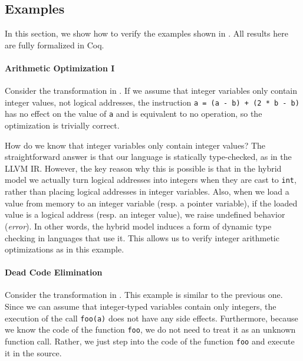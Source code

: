\subsection{Examples}
\label{sec:intptrcast:compiler-verification:examples}

In this section, we show how to verify the examples shown in .  All
results here are fully formalized in Coq.

\paragraph{Arithmetic Optimization I}

Consider the transformation in . If we assume that
integer variables only contain integer values, not logical addresses, the instruction \texttt{a = (a
  - b) + (2 * b - b)} has no effect on the value of \texttt{a} and is equivalent to no operation, so
the optimization is trivially correct.

How do we know that integer variables only contain
integer values? The straightforward answer is that our language is statically type-checked, as in the LLVM IR. However, the key reason why this is possible
is that in the hybrid model we actually turn logical addresses into integers
when they are cast to \texttt{int}, rather than placing logical addresses in integer
variables. Also, when we load a value from memory to an integer 
variable (resp. a pointer variable), 
if the loaded value is a logical address (resp. an integer value), we raise undefined
behavior (\ie \emph{error}).
In other words, the hybrid model induces a form of dynamic type
checking in languages that use it. This allows us to verify integer
arithmetic optimizations as in this example.

\paragraph{Dead Code Elimination}

Consider the transformation in .  This example
is similar to the previous one.  Since we can assume that integer-typed
variables contain only integers, the execution of the call
\texttt{foo(a)} does not have any side effects.
Furthermore, because we know the code of the function
\texttt{foo}, we do not need to treat it as an unknown function call.
Rather, we just step into the code of the function \texttt{foo} and
execute it in the source.%

